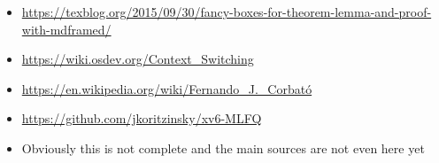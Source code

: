 \documentclass{report}
\begin{document}
\begin{itemize}
    \item \url{https://texblog.org/2015/09/30/fancy-boxes-for-theorem-lemma-and-proof-with-mdframed/}
    \item \url{https://wiki.osdev.org/Context_Switching}
    \item \url{https://en.wikipedia.org/wiki/Fernando_J._Corbató}
    \item \url{https://github.com/jkoritzinsky/xv6-MLFQ}
    \item Obviously this is not complete and the main sources are not even here yet
\end{itemize}
\end{document}
